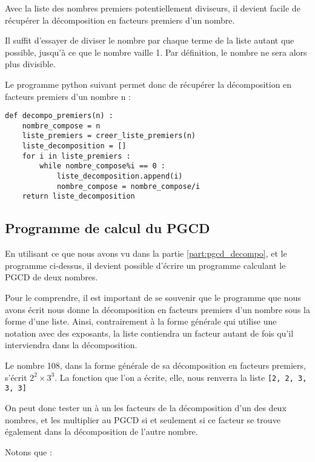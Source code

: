 Avec la liste des nombres premiers potentiellement diviseurs, il devient facile de récupérer la décomposition en facteurs premiers d'un nombre.

Il suffit d'essayer de diviser le nombre par chaque terme de la liste autant que possible, jusqu'à ce que le nombre vaille 1. Par définition, le nombre ne sera alors plus divisible.

Le programme python suivant permet donc de récupérer la décomposition en facteurs premiers d'un nombre n :


\begin{verbatim}
def decompo_premiers(n) :
    nombre_compose = n
    liste_premiers = creer_liste_premiers(n)
    liste_decomposition = []
    for i in liste_premiers :
        while nombre_compose%i == 0 :
            liste_decomposition.append(i)
            nombre_compose = nombre_compose/i
    return liste_decomposition
\end{verbatim}

\subsection{Programme de calcul du PGCD}

En utilisant ce que nous avons vu dans la partie \ref{part:pgcd_decompo}, et le programme ci-dessus, il devient possible d'écrire un programme calculant le PGCD de deux nombres.

Pour le comprendre, il est important de se souvenir que le programme que nous avons écrit nous donne la décomposition en facteurs premiers d'un nombre sous la forme d'une liste. Ainsi, contrairement à la forme générale qui utilise une notation avec des exposants, la liste contiendra un facteur autant de fois qu'il interviendra dans la décomposition.

\begin{example}
Le nombre 108, dans la forme générale de sa décomposition en facteurs premiers, s'écrit {$2^2 \times 3^3$}.
La fonction que l'on a écrite, elle, nous renverra la liste \texttt{[2, 2, 3, 3, 3]}
\end{example}

On peut donc tester un à un les facteurs de la décomposition d'un des deux nombres, et les multiplier au PGCD si et seulement si ce facteur se trouve également dans la décomposition de l'autre nombre.

Notons que :

